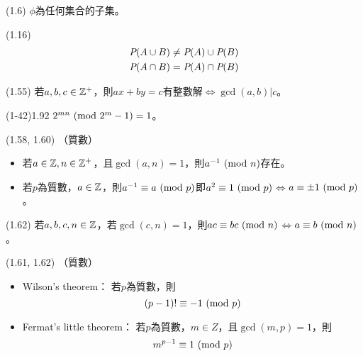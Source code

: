 \item \begin{theorem}{(1.6)} $\phi$為任何集合的子集。
\end{theorem}

\item \begin{theorem}{(1.16)} \begin{subequations}
    \begin{align}
        \P(A \cup B) & \neq \P(A) \cup \P(B) \\
        \P(A \cap B) & = \P(A) \cap \P(B)
    \end{align}
    \end{subequations}
\end{theorem}

\item \begin{theorem}{(1.55)} 若$a, b, c \in \N$，則$ax + by = c$有整數解$\iff$$\gcd(a, b) | c$。
\end{theorem}

\item \begin{theorem}{(1-42)1.92} $2^{mn} \Mod{2^m - 1} = 1$。
\end{theorem}

\item \begin{theorem}{(1.58, 1.60)} （質數）
    \begin{itemize}
        \item 若$a \in \Z, n \in \N$，且$\gcd(a, n) = 1$，則$a^{-1} \Mod{n}$存在。
        \item 若$p$為質數，$a \in \Z$，則$a^{-1} \equiv a \Mod{p}$即$a^2 \equiv 1 \Mod{p}$$\iff$$a \equiv \pm 1 \Mod{p}$。
    \end{itemize}
\end{theorem}

\item \begin{theorem}{(1.62)} 若$a, b, c, n \in \Z$，若$\gcd(c, n) = 1$，則$ac \equiv bc \Mod{n}$$\iff$$a \equiv b \Mod{n}$。
\end{theorem}

\item \begin{theorem}{(1.61, 1.62)} （質數）
    \begin{itemize}
        \item Wilson's theorem：
        若$p$為質數，則
        \begin{equation}
            (p - 1)! \equiv -1 \Mod{p}
        \end{equation}
        \item Fermat's little theorem：
        若$p$為質數，$m \in Z$，且$\gcd(m, p) = 1$，則
        \begin{equation}
            m^{p - 1} \equiv 1 \Mod{p}
        \end{equation}
    \end{itemize}
\end{theorem}


